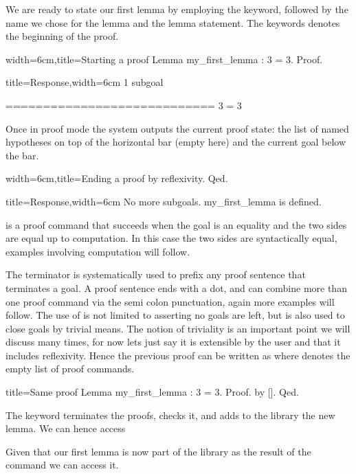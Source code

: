We are ready to state our first lemma by employing the  keyword,
followed by the name we chose for the lemma and the lemma statement.
The  keywords denotes the beginning of the proof.

\begin{coq}{width=6cm,title=Starting a proof}
Lemma my_first_lemma : 3 = 3.
Proof.
\end{coq}
\begin{coqout}{title=Response,width=6cm}
1 subgoal
  
  ============================
   3 = 3
\end{coqout}

Once in proof mode the system outputs the current proof state:
the list of named hypotheses on top of the horizontal bar (empty here)
and the current goal below the bar.

\begin{coq}{width=6cm,title=Ending a proof}
by reflexivity.
Qed.
\end{coq}
\begin{coqout}{title=Response,width=6cm}
No more subgoals.
my_first_lemma is defined.
\end{coqout}

 is a proof command that succeeds when the goal is an equality
and the two sides are equal up to computation.  In this case the two sides
are syntactically equal, examples involving computation will follow.

The  terminator is systematically used to prefix any proof sentence
that terminates a goal.  A proof sentence ends with a dot, and can
combine more than one proof command via the semi colon punctuation,
again more examples will follow.
The use of  is not limited to asserting no goals are left,
but is also used to close goals by trivial means.  The notion of triviality
is an important point we will discuss many times, for now lets just
say it is extensible by the user and that it includes reflexivity.
Hence the previous proof can be written as  where \C{[]}
denotes the empty list of proof commands.

\begin{coq}{title=Same proof}
Lemma my_first_lemma : 3 = 3.
Proof. by []. Qed.
\end{coq}

The  keyword terminates the proofs, checks it, and adds to
the library the new lemma.  We can hence access

Given that our first lemma is now part of the library as the result
of the  command we can access it.

